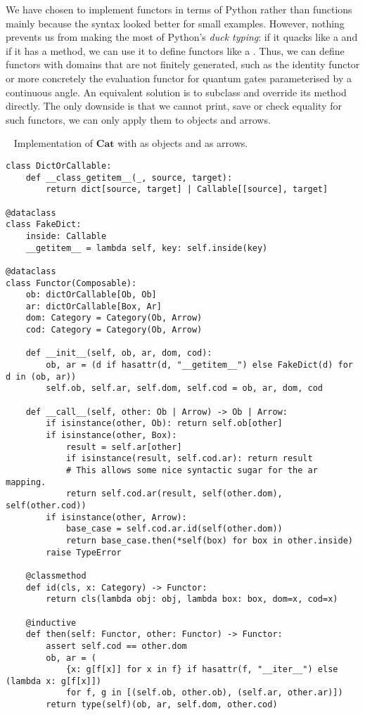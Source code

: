 We have chosen to implement functors in terms of Python  rather than functions mainly because the syntax looked better for small examples.
However, nothing prevents us from making the most of Python's \emph{duck typing}: if it quacks like a  and if it has a  method, we can use it to define functors like a .
Thus, we can define functors with domains that are not finitely generated, such as the identity functor or more concretely the evaluation functor for quantum gates parameterised by a continuous angle.
An equivalent solution is to subclass  and override its  method directly.
The only downside is that we cannot print, save or check equality for such functors, we can only apply them to objects and arrows.

\begin{python}~\label{listing:Functor}
{\normalfont Implementation of $\mathbf{Cat}$ with  as objects and  as arrows.}

\begin{verbatim}
class DictOrCallable:
    def __class_getitem__(_, source, target):
        return dict[source, target] | Callable[[source], target]

@dataclass
class FakeDict:
    inside: Callable
    __getitem__ = lambda self, key: self.inside(key)

@dataclass
class Functor(Composable):
    ob: dictOrCallable[Ob, Ob]
    ar: dictOrCallable[Box, Ar]
    dom: Category = Category(Ob, Arrow)
    cod: Category = Category(Ob, Arrow)

    def __init__(self, ob, ar, dom, cod):
        ob, ar = (d if hasattr(d, "__getitem__") else FakeDict(d) for d in (ob, ar))
        self.ob, self.ar, self.dom, self.cod = ob, ar, dom, cod

    def __call__(self, other: Ob | Arrow) -> Ob | Arrow:
        if isinstance(other, Ob): return self.ob[other]
        if isinstance(other, Box):
            result = self.ar[other]
            if isinstance(result, self.cod.ar): return result
            # This allows some nice syntactic sugar for the ar mapping.
            return self.cod.ar(result, self(other.dom), self(other.cod))
        if isinstance(other, Arrow):
            base_case = self.cod.ar.id(self(other.dom))
            return base_case.then(*self(box) for box in other.inside)
        raise TypeError

    @classmethod
    def id(cls, x: Category) -> Functor:
        return cls(lambda obj: obj, lambda box: box, dom=x, cod=x)

    @inductive
    def then(self: Functor, other: Functor) -> Functor:
        assert self.cod == other.dom
        ob, ar = (
            {x: g[f[x]] for x in f} if hasattr(f, "__iter__") else (lambda x: g[f[x]])
            for f, g in [(self.ob, other.ob), (self.ar, other.ar)])
        return type(self)(ob, ar, self.dom, other.cod)
\end{verbatim}
\end{python}

